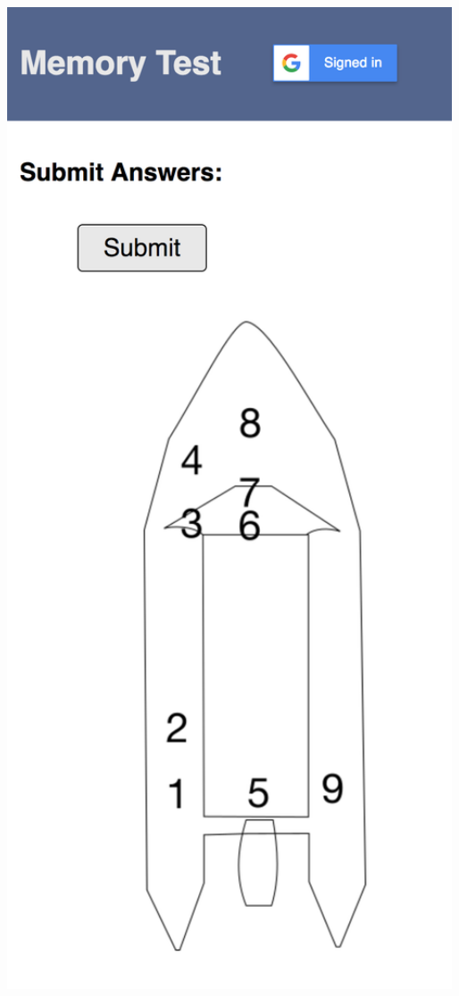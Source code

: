 \documentclass[ %
                    author={Elis Jones},
                supervisor={Dr. Kirsten Cater},
                    degree={BSc},
                     title={The Effect of Presentation Medium on Spatial Cognition},
                  subtitle={in the Virtual Environment},
                      year={2018} ]{dissertation}
\begin{document}
\begin{center}
\begin{minipage}{0.3\textwidth}
    \end{minipage}\hfill
    \begin{minipage}{0.3\textwidth}
        \centering
        \includegraphics[width=1\textwidth]{images/web-thanks.png}
    \end{minipage}\hfill
    \label{web-design}
\end{center}
\end{document}
